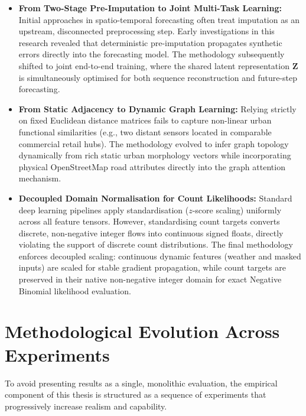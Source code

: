 \begin{itemize}
    \item \textbf{From Two-Stage Pre-Imputation to Joint Multi-Task Learning:}
    Initial approaches in spatio-temporal forecasting often treat imputation as an upstream, disconnected preprocessing step. Early investigations in this research revealed that deterministic pre-imputation propagates synthetic errors directly into the forecasting model. The methodology subsequently shifted to joint end-to-end training, where the shared latent representation $\mathbf{Z}$ is simultaneously optimised for both sequence reconstruction and future-step forecasting.

    \item \textbf{From Static Adjacency to Dynamic Graph Learning:}
    Relying strictly on fixed Euclidean distance matrices fails to capture non-linear urban functional similarities (e.g., two distant sensors located in comparable commercial retail hubs). The methodology evolved to infer graph topology dynamically from rich static urban morphology vectors while incorporating physical OpenStreetMap road attributes directly into the graph attention mechanism.

    \item \textbf{Decoupled Domain Normalisation for Count Likelihoods:}
    Standard deep learning pipelines apply standardisation ($z$-score scaling) uniformly across all feature tensors. However, standardising count targets converts discrete, non-negative integer flows into continuous signed floats, directly violating the support of discrete count distributions. The final methodology enforces decoupled scaling: continuous dynamic features (weather and masked inputs) are scaled for stable gradient propagation, while count targets are preserved in their native non-negative integer domain for exact Negative Binomial likelihood evaluation.
\end{itemize}


\section{Methodological Evolution Across Experiments}
\label{sec:meth-evolution}

To avoid presenting results as a single, monolithic evaluation, the empirical component of this thesis is structured as a sequence of experiments that progressively increase realism and capability.

